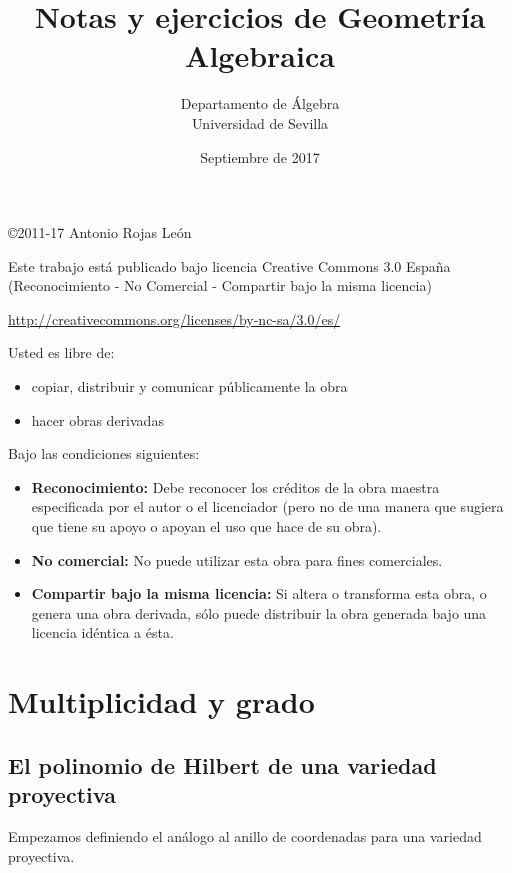 \documentclass[ACGA.tex]{subfiles}
\title{Notas y ejercicios de Geometría Algebraica}
\author{Departamento de Álgebra \\ Universidad de Sevilla}
\date{Septiembre de 2017}
\begin{document}
\setcounter{chapter}{5}
\maketitle

\vspace*{\fill}

\copyright{2011-17 Antonio Rojas León}

\bigskip

Este trabajo está publicado bajo licencia Creative Commons 3.0 España (Reconocimiento - No Comercial - Compartir bajo la misma licencia)

\url{http://creativecommons.org/licenses/by-nc-sa/3.0/es/}

\bigskip

Usted es libre de:
\begin{itemize}
 \item copiar, distribuir y comunicar públicamente la obra
\item hacer obras derivadas
\end{itemize}

Bajo las condiciones siguientes:
\begin{itemize}
 \item {\bf Reconocimiento:} Debe reconocer los créditos de la obra maestra especificada por el autor o el licenciador (pero no de una manera que sugiera que tiene su apoyo o apoyan el uso que hace de su obra).
 \item {\bf No comercial:} No puede utilizar esta obra para fines comerciales.
\item {\bf Compartir bajo la misma licencia:} Si altera o transforma esta obra, o genera una obra derivada, sólo puede distribuir la obra generada bajo una licencia idéntica a ésta.
\end{itemize}




\newpage


\chapter{Multiplicidad y grado}

\section[El polinomio de Hilbert]{El polinomio de Hilbert de una variedad proyectiva}

Empezamos definiendo el análogo al anillo de coordenadas para una variedad proyectiva.
\end{document}
